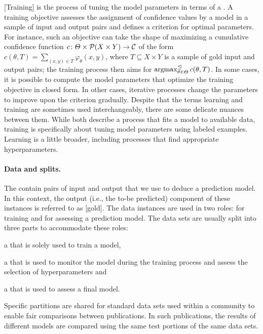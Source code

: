 \documentclass[../document.tex]{subfiles}
\begin{document}
    [Training] is the process of tuning the model parameters in terms of a .
    A training objective assesses the assignment of confidence values by a model in a sample of input and output pairs and defines a criterion for optimal parameters.
    For instance, such an objective can take the shape of maximizing a cumulative confidence function \(c\colon \varTheta \times \mathcal{P}(X \times Y) \to \mathcal{C}\) of the form \(c(\theta, T) = \sum_{(x,y) \in T} \varphi_\theta(x, y)\), where \(T \subseteq X \times Y\) is a sample of gold\label{pg:def:gold} input and output pairs; the training process then aims for \(\operatorname{arg max}^{\mathrel{\unlhd}}_{\theta \in \varTheta} c(\theta, T)\).
    In some cases, it is possible to compute the model parameters that optimize the training objective in closed form.
    In other cases, iterative processes change the parameters to improve upon the criterion gradually.
    Despite that the terms learning and training are sometimes used interchangeably, there are some delicate nuances between them.
    While both describe a process that fits a model to available data, training is specifically about tuning model parameters using labeled examples.
    Learning is a little broader, including processes that find appropriate hyperparameters.

    \paragraph{Data and splits.}
    The  contain pairs of input and output that we use to deduce a prediction model.
    In this context, the output (i.e., the to-be predicted) component of these instances is referred to as [gold].
    The data instances are used in two roles: for training and for assessing a prediction model.
    The data sets are usually split into three parts to accommodate these roles:
    \begin{inparaenum}
        \item a  that is solely used to train a model,
        \item a  that is used to monitor the model during the training process and assess the selection of hyperparameters and
        \item a  that is used to assess a final model.
    \end{inparaenum}
    Specific partitions are shared for standard data sets used within a community to enable fair comparisons between publications.
    In such publications, the results of different models are compared using the same test portions of the same data sets.
\end{document}
